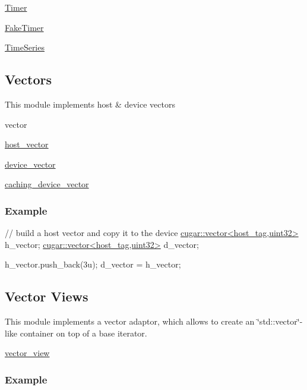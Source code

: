 \begin{DoxyItemize}
\item \hyperlink{structcugar_1_1_timer}{Timer}
\item \hyperlink{structcugar_1_1_fake_timer}{Fake\+Timer}
\item \hyperlink{structcugar_1_1_time_series}{Time\+Series} 
\end{DoxyItemize}\hypertarget{vectors_page}{}\subsection{Vectors}\label{vectors_page}
This module implements host \& device vectors


\begin{DoxyItemize}
\item vector
\item \hyperlink{structcugar_1_1host__vector}{host\+\_\+vector}
\item \hyperlink{structcugar_1_1device__vector}{device\+\_\+vector}
\item \hyperlink{structcugar_1_1caching__device__vector}{caching\+\_\+device\+\_\+vector}
\end{DoxyItemize}\hypertarget{vectors_page_VectorsExampleSection}{}\subsubsection{Example}\label{vectors_page_VectorsExampleSection}

\begin{DoxyCode}
\textcolor{comment}{// build a host vector and copy it to the device}
\hyperlink{structcugar_1_1vector}{cugar::vector<host\_tag,uint32>} h\_vector;
\hyperlink{structcugar_1_1vector}{cugar::vector<host\_tag,uint32>} d\_vector;

h\_vector.push\_back(3u);
d\_vector = h\_vector;
\end{DoxyCode}
 \hypertarget{vector_views_page}{}\subsection{Vector Views}\label{vector_views_page}
This module implements a vector adaptor, which allows to create an \char`\"{}std\+::vector\char`\"{}-\/like container on top of a base iterator.


\begin{DoxyItemize}
\item \hyperlink{structcugar_1_1vector__view}{vector\+\_\+view}
\end{DoxyItemize}\hypertarget{vector_views_page_VectorViewExampleSection}{}\subsubsection{Example}\label{vector_views_page_VectorViewExampleSection}


